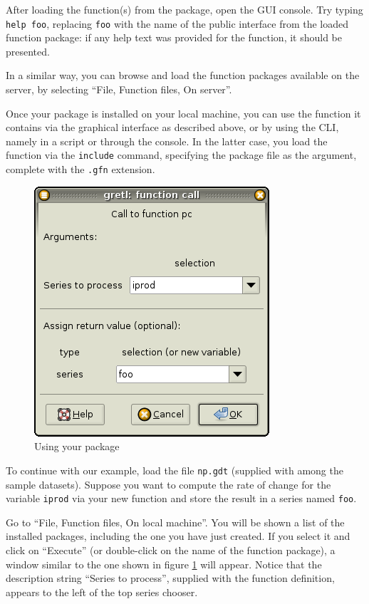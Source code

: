 After loading the function(s) from the package, open the GUI console.
Try typing \texttt{help foo}, replacing \texttt{foo} with the name of
the public interface from the loaded function package: if any help text
was provided for the function, it should be presented.

In a similar way, you can browse and load the function packages
available on the  server, by selecting ``File, Function
files, On server''.

Once your package is installed on your local machine, you can use the
function it contains via the graphical interface as described above,
or by using the CLI, namely in a script or through the console. In the
latter case, you load the function via the \texttt{include} command,
specifying the package file as the argument, complete with the
\texttt{.gfn} extension.

\begin{figure}[htbp]
  \centering
  \includegraphics[scale=0.5]{figures/function_call}
  \caption{Using your package}
  \label{fig:function_call}
\end{figure}

To continue with our example, load the file \texttt{np.gdt} (supplied
with  among the sample datasets). Suppose you want to
compute the rate of change for the variable \texttt{iprod} via your
new function and store the result in a series named \texttt{foo}.

Go to ``File, Function files, On local machine''.  You will be shown a
list of the installed packages, including the one you have just
created. If you select it and click on ``Execute'' (or double-click on
the name of the function package), a window similar to the one shown
in figure \ref{fig:function_call} will appear.  Notice that the
description string ``Series to process'', supplied with the function
definition, appears to the left of the top series chooser.

